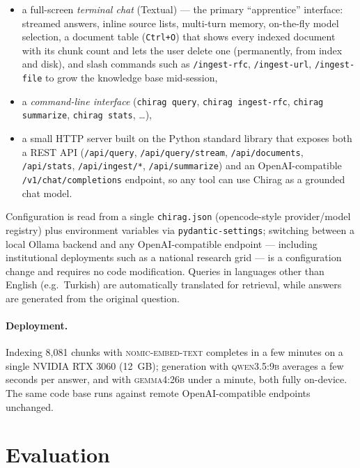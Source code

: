 \documentclass[version=submission]{iacrcc}
\begin{document}
\begin{itemize}
\item a full-screen \emph{terminal chat} (Textual) --- the primary
  ``apprentice'' interface: streamed answers, inline source lists, multi-turn
  memory, on-the-fly model selection, a document table (\texttt{Ctrl+O}) that
  shows every indexed document with its chunk count and lets the user delete
  one (permanently, from index and disk), and slash commands such as
  \texttt{/ingest-rfc}, \texttt{/ingest-url}, \texttt{/ingest-file} to grow
  the knowledge base mid-session,
\item a \emph{command-line interface} (\texttt{chirag query}, \texttt{chirag
  ingest-rfc}, \texttt{chirag summarize}, \texttt{chirag stats}, \ldots),
\item a small HTTP server built on the Python standard library that exposes
  both a REST API (\texttt{/api/query}, \texttt{/api/query/stream},
  \texttt{/api/documents}, \texttt{/api/stats}, \texttt{/api/ingest/*},
  \texttt{/api/summarize}) and an OpenAI-compatible
  \texttt{/v1/chat/completions} endpoint, so any tool can use Chirag as a
  grounded chat model.
\end{itemize}

Configuration is read from a single \texttt{chirag.json} (opencode-style
provider/model registry) plus environment variables via
\texttt{pydantic-settings}; switching between a local Ollama backend and any
OpenAI-compatible endpoint --- including institutional deployments such as a
national research grid --- is a configuration change and requires no code
modification. Queries in languages other than English (e.g.\ Turkish) are
automatically translated for retrieval, while answers are generated from the
original question.

\paragraph{Deployment.}
Indexing 8{,}081 chunks with \textsc{nomic-embed-text} completes in a few
minutes on a single NVIDIA RTX 3060 (12~GB); generation with
\textsc{qwen3.5:9b} averages a few seconds per answer, and with
\textsc{gemma4:26b} under a minute, both fully on-device. The same code
base runs against remote OpenAI-compatible endpoints unchanged.

\section{Evaluation}
\label{sec:eval}
\end{document}

